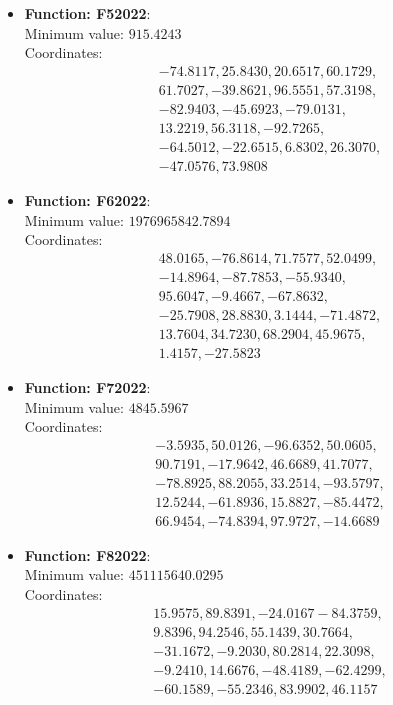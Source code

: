 \documentclass{article}
\begin{document}
\begin{itemize}
  \item \textbf{Function: F52022}: \\
    Minimum value: $915.4243$ \\
    Coordinates:
    \[
      \begin{aligned}
        & -74.8117,  25.8430,  20.6517, 60.1729, \\
        & 61.7027,  -39.8621,  96.5551, 57.3198, \\
        & -82.9403,  -45.6923,  -79.0131, \\
        & 13.2219,  56.3118,  -92.7265, \\
        & -64.5012, -22.6515,  6.8302,  26.3070, \\
        & -47.0576, 73.9808
      \end{aligned}
    \]

  \item \textbf{Function: F62022}: \\
    Minimum value: $1976965842.7894$ \\
    Coordinates:
    \[
      \begin{aligned}
        & 48.0165,  -76.8614,  71.7577, 52.0499, \\
        & -14.8964,  -87.7853,  -55.9340, \\
        & 95.6047,  -9.4667,  -67.8632, \\
        & -25.7908, 28.8830,  3.1444,  -71.4872, \\
        & 13.7604, 34.7230,  68.2904,  45.9675, \\
        & 1.4157, -27.5823
      \end{aligned}
    \]

  \item \textbf{Function: F72022}: \\
    Minimum value: $4845.5967$ \\
    Coordinates:
    \[
      \begin{aligned}
        & -3.5935,  50.0126,  -96.6352, 50.0605, \\
        & 90.7191,  -17.9642,  46.6689, 41.7077, \\
        & -78.8925,  88.2055,  33.2514, -93.5797, \\
        & 12.5244,  -61.8936,  15.8827, -85.4472, \\
        & 66.9454,  -74.8394,  97.9727, -14.6689
      \end{aligned}
    \]

  \item \textbf{Function: F82022}: \\
    Minimum value: $451115640.0295$ \\
    Coordinates:
    \[
      \begin{aligned}
        & 15.9575,  89.8391,  -24.0167 -84.3759, \\
        & 9.8396,  94.2546,  55.1439, 30.7664, \\
        & -31.1672,  -9.2030,  80.2814, 22.3098, \\
        & -9.2410,  14.6676,  -48.4189, -62.4299, \\
        & -60.1589,  -55.2346,  83.9902, 46.1157
      \end{aligned}
    \]


\end{itemize}
\end{document}
